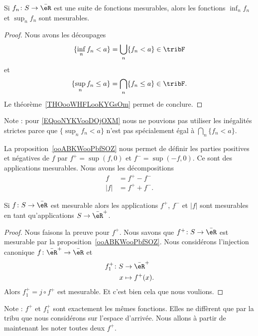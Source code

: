 \begin{proposition}     \label{ooABKWooPbfSOZ}
    Si \( f_n\colon S\to \bar \eR\) est une suite de fonctions mesurables, alors les fonctions \( \inf_n f_n\) et \( \sup_nf_n\) sont mesurables.
\end{proposition}

\begin{proof}
    Nous avons les découpages
    \begin{equation}
        \{ \inf_nf_n<a \}=\bigcup_n\{ f_n<a \}\in\tribF
    \end{equation}
    et
    \begin{equation}        \label{EQooNYKVooDOjOXM}
        \{ \sup_nf_n\leq a \}=\bigcap_n\{ f_n\leq a \}\in\tribF.
    \end{equation}
    Le théorème~\ref{THOooWHFLooKYGsOm} permet de conclure.
\end{proof}
Note : pour \eqref{EQooNYKVooDOjOXM} nous ne pouvions pas utiliser les inégalités strictes parce que \( \{ \sup_nf_n<a \}\) n'est pas spécialement égal à \( \bigcap_n\{ f_n<a \}\).

\begin{normaltext}
    La proposition~\ref{ooABKWooPbfSOZ} nous permet de définir les parties positives et négatives de \( f\) par \( f^+=\sup(f,0)\) et \( f^-=\sup(-f,0)\). Ce sont des applications mesurables. Nous avons les décompositions
    \begin{subequations}
        \begin{align}
            f     & = f^+-f^- \\
            | f | & = f^++f^-.
        \end{align}
    \end{subequations}
\end{normaltext}

\begin{corollary}       \label{CORooNXYUooEcvDlP}
    Si \( f\colon S\to \bar \eR\) est mesurable alors les applications \( f^+\), \( f^-\) et \( | f |\) sont mesurables en tant qu'applications \( S\to\bar \eR^+\).
\end{corollary}

\begin{proof}
    Nous faisons la preuve pour \( f^+\). Nous savons que \( f^+\colon S\to \bar \eR\) est mesurable par la proposition~\ref{ooABKWooPbfSOZ}. Nous considérons l'injection canonique \( f\colon \bar \eR^+\to \bar \eR\) et
    \begin{equation}
        \begin{aligned}
            f_1^+\colon S & \to \bar \eR^+        \\
                        x & \mapsto f^+(x).
        \end{aligned}
    \end{equation}
    Alors \( f_1^+=j\circ f^+\) est mesurable. Et c'est bien cela que nous voulions.

\end{proof}
Note : \( f^+\) et \( f_1^+\) sont exactement les mêmes fonctions. Elles ne diffèrent que par la tribu que nous considérons sur l'espace d'arrivée. Nous allons à partir de maintenant les noter toutes deux \( f^+\).

